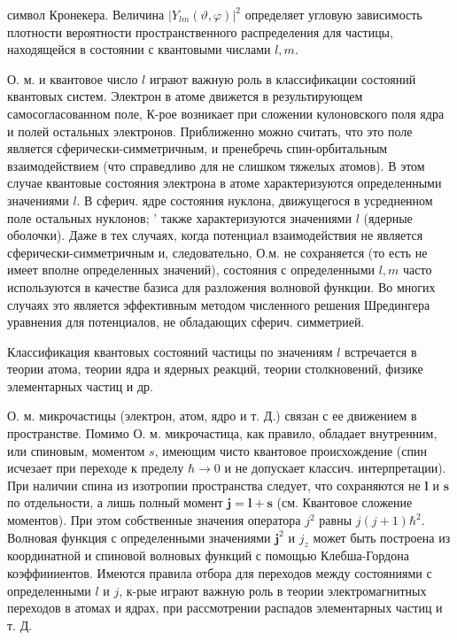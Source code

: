 \documentclass[10pt]{article}
\begin{document}
символ Кронекера. Величина $\left|Y_{l m}(\vartheta, \varphi)\right|^{2}$ определяет угловую зависимость плотности вероятности пространственного распределения для частицы, находящейся в состоянии с квантовыми числами $l, m$.



О. м. и квантовое число $l$ играют важную роль в классификации состояний квантовых систем. Электрон в атоме движется в результирующем самосогласованном поле, К-рое возникает при сложении кулоновского поля ядра и полей остальных электронов. Приближенно можно считать, что это поле является сферически-симметричным, и пренебречь спин-орбитальным взаимодействием (что справедливо для не слишком тяжелых атомов). В этом случае квантовые состояния электрона в атоме характеризуются определенными значениями $l$. В сферич. ядре состояния нуклона, движущегося в усредненном поле остальных нуклонов; ' также характеризуются значениями $l$ (ядерные оболочки). Даже в тех случаях, когда потенциал взаимодействия не является сферически-симметричным и, следовательно, О.м. не сохраняется (то есть не имеет вполне определенных значений), состояния с определенными $l, m$ часто используются в качестве базиса для разложения волновой функции. Во многих случаях это является эффективным методом численного решения Шредингера уравнения для потенциалов, не обладающих сферич. симметрией.



Классификация квантовых состояний частицы по значениям $l$ встречается в теории атома, теории ядра и ядерных реакций, теории столкновений, физике элементарных частиц и др.



О. м. микрочастицы (электрон, атом, ядро и т. Д.) связан с ее движением в пространстве. Помимо О. м. микрочастица, как правило, обладает внутренним, или спиновым, моментом $s$, имеющим чисто квантовое происхождение (спин исчезает при переходе к пределу $\hbar \rightarrow 0$ и не допускает классич. интерпретации). При наличии спина из изотропии пространства следует, что сохраняются не $\boldsymbol{l}$ и $\boldsymbol{s}$ по отдельности, а лишь полный момент $\boldsymbol{j}=\boldsymbol{l}+\boldsymbol{s}$ (см. Квантовое сложение моментов). При этом собственные значения оператора $j^{2}$ равны $j(j+1) \hbar^{2}$. Волновая функция с определенными значениями $\boldsymbol{j}^{2}$ и $j_{z}$ может быть построена из координатной и спиновой волновых функций с помощью Клебша-Гордона коэффиииентов. Имеются правила отбора для переходов между состояниями с определенными $l$ и $j$, к-рые играют важную роль в теории электромагнитных переходов в атомах и ядрах, при рассмотрении распадов элементарных частиц и т. Д.
\end{document}
